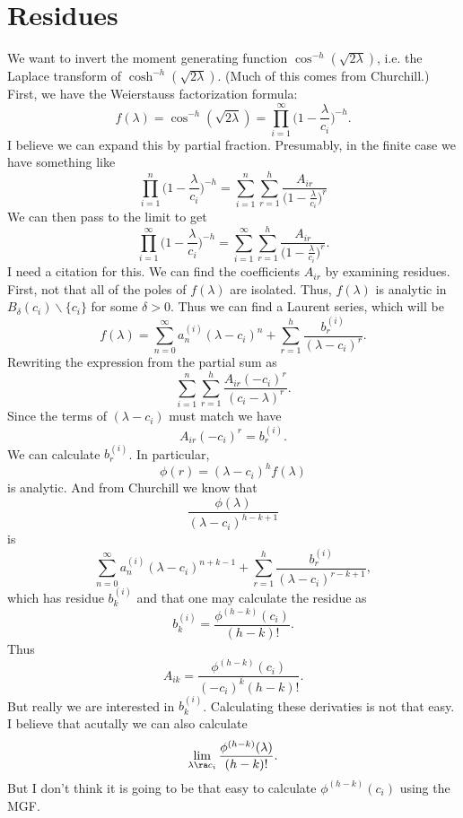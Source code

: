 \documentclass[12pt]{article}
\begin{document}
\section{Residues}

We want to invert the moment generating function $\cos^{-h}(\sqrt{2\lambda})$,
i.e. the Laplace transform of $\cosh^{-h}(\sqrt{2 \lambda})$.  (Much of this
comes from Churchill.)  First, we have the Weierstauss factorization formula:
\[
f(\lambda) = \cos^{-h}(\sqrt{2 \lambda}) = \prod_{i=1}^\infty \Big(1 -
\frac{\lambda}{c_i}\Big)^{-h}.
\]
I believe we can expand this by partial fraction.  Presumably, in the finite
case we have something like
\[
\prod_{i=1}^n \Big(1 - \frac{\lambda}{c_i}\Big)^{-h} = \sum_{i=1}^n \sum_{r=1}^h
\frac{A_{ir}}{\Big(1 - \frac{\lambda}{c_i}\Big)^{r}}
\]
We can then pass to the limit to get
\[
\prod_{i=1}^\infty \Big(1 - \frac{\lambda}{c_i}\Big)^{-h} = \sum_{i=1}^\infty \sum_{r=1}^h
\frac{A_{ir}}{\Big(1 - \frac{\lambda}{c_i}\Big)^r}.
\]
I need a citation for this.  We can find the coefficients $A_{ir}$ by examining
residues.  First, not that all of the poles of $f(\lambda)$ are isolated.  Thus,
$f(\lambda)$ is analytic in $B_{\delta}(c_i) \backslash \{c_i\}$ for some
$\delta > 0$.  Thus we can find a Laurent series, which will be
\[
f(\lambda) = \sum_{n=0}^\infty a_n^{(i)} (\lambda - c_i)^n + \sum_{r=1}^h
\frac{b_r^{(i)}}{(\lambda - c_i)^{r}}.
\]
Rewriting the expression from the partial sum as
\[
\sum_{i=1}^n \sum_{r=1}^h \frac{A_{ir} (-c_i)^r}{(c_i - \lambda)^r}.
\]
Since the terms of $(\lambda - c_i)$ must match we have
\[
A_{ir} (-c_i)^r = b_r^{(i)}.
\]
We can calculate $b_r^{(i)}$.  In particular,
\[
\phi(r) = (\lambda - c_i)^h f(\lambda)
\]
is analytic.  And from Churchill we know that
\[
\frac{\phi(\lambda)}{(\lambda-c_i)^{h-k+1}}
\]
is
\[
\sum_{n=0}^\infty a_n^{(i)} (\lambda - c_i)^{n+k-1} + \sum_{r=1}^h
\frac{b_r^{(i)}}{(\lambda - c_i)^{r-k+1}},
\]
which has residue $b_k^{(i)}$ and that one may calculate the residue as
\[
b_k^{(i)} = \frac{\phi^{(h-k)}(c_i)}{(h-k)!}.
\]
Thus
\[
A_{ik} = \frac{\phi^{(h-k)}(c_i)}{(-c_i)^k (h-k)!}.
\]
But really we are interested in $b_k^{(i)}$.  Calculating these derivaties is
not that easy.  I believe that acutally we can also calculate
\[
\lim_{\lambda \ra c_i} \frac{\phi^{(h-k)}(\lambda)}{(h-k)!}.
\]
But I don't think it is going to be that easy to calculate $\phi^{(h-k)}(c_i)$
using the MGF.  
\end{document}
